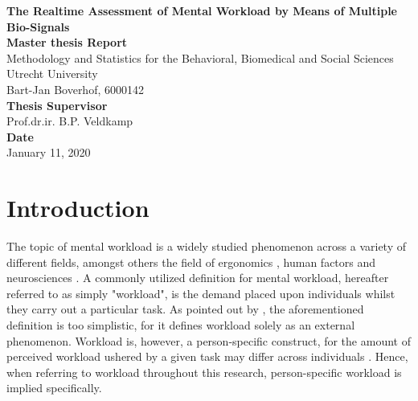 \documentclass[12pt]{article}
\begin{document}
\begin{titlepage}
\begin{center}
\LARGE{\textbf{The Realtime Assessment of Mental Workload by Means of Multiple Bio-Signals}}\\
\vspace*{2\baselineskip}
\Large{\textbf{Master thesis Report}}\\
Methodology and Statistics for the Behavioral, Biomedical and Social Sciences\\
\vspace*{1\baselineskip}
Utrecht University\\
\vspace*{4\baselineskip}
{Bart-Jan Boverhof, 6000142}\\
\vspace*{1\baselineskip}
{\textbf{Thesis Supervisor}}\\
Prof.dr.ir. B.P. Veldkamp\\
\vspace*{1\baselineskip}
{\textbf{Date}}\\
January 11, 2020\\
\vspace*{1\baselineskip}
\end{center}
\end{titlepage}

\section{Introduction} \label{Introduction}
The topic of mental workload is a widely studied 
phenomenon across a variety of different fields, amongst others the field of ergonomics \cite{young2015state}, human factors \cite{pretorius2007development} and neurosciences \cite{shuggi2017mental}. A commonly utilized definition for mental workload, hereafter referred to as simply "workload", is the demand placed upon individuals whilst they carry out a particular task. As pointed out by , the aforementioned definition is too simplistic, for it defines workload solely as an external phenomenon. Workload is, however, a person-specific construct, for the amount of perceived workload ushered by a given task may differ across individuals \cite{de1996measurement}. Hence, when referring to workload throughout this research, person-specific workload is implied specifically. 
\end{document}
